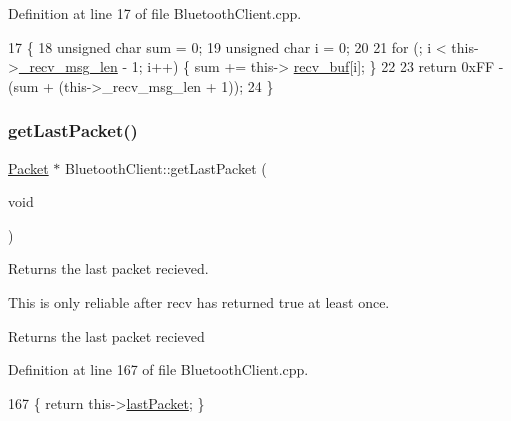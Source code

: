 Definition at line 17 of file Bluetooth\+Client.\+cpp.


\begin{DoxyCode}
17                                                 \{
18     \textcolor{keywordtype}{unsigned} \textcolor{keywordtype}{char} sum = 0;
19     \textcolor{keywordtype}{unsigned} \textcolor{keywordtype}{char} i = 0;
20 
21     \textcolor{keywordflow}{for} (; i < this->\hyperlink{class_bluetooth_client_a30e47aa21808bd60b99cf5778e67c059}{\_recv\_msg\_len} - 1; i++) \{ sum += this->
      \hyperlink{class_bluetooth_client_a83675b45ddf8021663ecd6200a22b1cb}{recv\_buf}[i]; \}
22 
23     \textcolor{keywordflow}{return} 0xFF - (sum + (this->\_recv\_msg\_len + 1));
24 \}
\end{DoxyCode}
\mbox{\label{class_bluetooth_client_ad009775f3bd7e30c53f2e1544bc83828}} 
\subsubsection{\texorpdfstring{get\+Last\+Packet()}{getLastPacket()}}
{\footnotesize\ttfamily \hyperlink{class_packet}{Packet} $\ast$ Bluetooth\+Client\+::get\+Last\+Packet (\begin{DoxyParamCaption}\item[{void}]{ }\end{DoxyParamCaption})}



Returns the last packet recieved. 

This is only reliable after recv has returned true at least once. \begin{DoxyReturn}{Returns}
the last packet recieved 
\end{DoxyReturn}


Definition at line 167 of file Bluetooth\+Client.\+cpp.


\begin{DoxyCode}
167 \{ \textcolor{keywordflow}{return} this->\hyperlink{class_bluetooth_client_aedcb6766e3a877b5e468ed1347caf483}{lastPacket}; \}
\end{DoxyCode}
\mbox{\label{class_bluetooth_client_ac054e730dd69d8e323781305ea1a610f}} 
